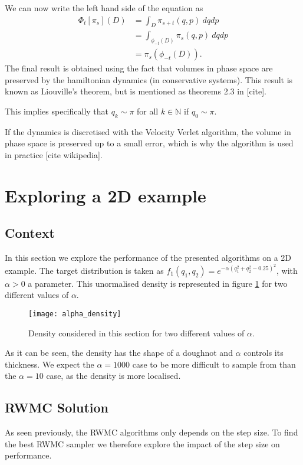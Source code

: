 \documentclass[a4paper, 12pt,oneside]{article}
\begin{document}
			We can now write the left hand side of the equation as
			\begin{align}
				\Phi_t[\pi_s](D)&=\int_D \pi_{s+t}(q,p)\ dqdp \\
					&=\int_{\phi_{-t}(D)}\pi_{s}(q,p)\ dqdp \\
					&=\pi_s(\phi_{-t}(D)).
			\end{align}
			The final result is obtained using the fact that volumes in phase space are preserved by the hamiltonian dynamics (in conservative systems). This result is known as Liouville's theorem, but is mentioned as theorems 2.3 in [cite].
	
			This implies specifically that $q_k\sim\pi$ for all $k\in\mathbb{N}$ if $q_0\sim \pi$. 
	
			If the dynamics is discretised with the Velocity Verlet algorithm, the volume in phase space is preserved up to a small error, which is why the algorithm is used in practice [cite wikipedia].
	\section{Exploring a 2D example}
		\subsection{Context}
		In this section we explore the performance of the presented algorithms on a 2D example. The target distribution is taken as $f_1(q_1,q_2)=e^{-\alpha(q_1^2+q_2^2-0.25)^2}$, with $\alpha>0$ a parameter. This unormalised density is represented in figure \ref{fig:alpha-density} for two different values of $\alpha$.
        \begin{figure}[htb]
            \centering
                \vspace{0em}
                \texttt{[image: alpha\_density]}
                \caption{Density considered in this section for two different values of $\alpha$.}
                \label{fig:alpha-density}
        \end{figure}
		As it can be seen, the density has the shape of a doughnot and $\alpha$ controls its thickness. We expect the $\alpha=1000$ case to be more difficult to sample from than the $\alpha=10$ case, as the density is more localised.
		\subsection{RWMC Solution}
			As seen previously, the RWMC algorithms only depends on the step size. To find the best RWMC sampler we therefore explore the impact of the step size on performance. 
			
\end{document}
